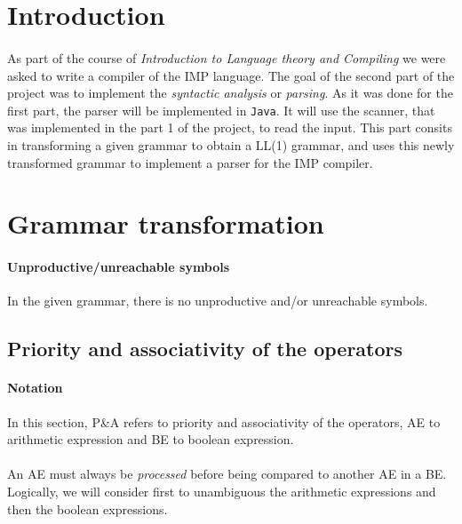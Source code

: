 \documentclass[letterpaper]{article}
\begin{document}
\section{Introduction}

\paragraph{}

As part of the course of \textit{Introduction to Language theory and Compiling}
we were asked to
write a compiler of the IMP language. The goal of the second part of the
project was to implement the \textit{syntactic analysis} or \textit{parsing}.
As it was done for the first part, the parser will be implemented in
\texttt{Java}. It will use the scanner, that was implemented in the part 1
of the project,
to read the input.
This part consits in transforming a given grammar to obtain a LL(1) grammar,
and uses this newly transformed grammar to implement a parser for the
IMP compiler.

\section{Grammar transformation}

\paragraph{Unproductive/unreachable symbols}

In the given grammar, there is no unproductive and/or unreachable symbols.

\subsection{Priority and associativity of the operators}

\paragraph{Notation} In this section, P\&A refers to priority and associativity
of the operators, AE to arithmetic expression and BE to boolean expression.

\paragraph{}

An AE must always be \textit{processed}
before being compared
to another AE in a BE. Logically, we will consider first to unambiguous
the arithmetic expressions and then the boolean expressions.
\end{document}
